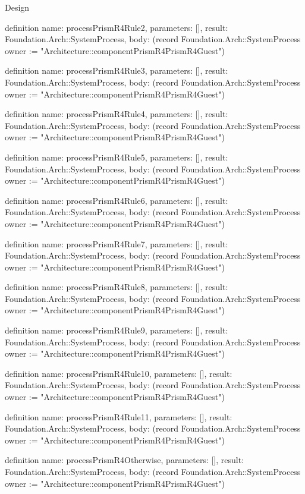 \begin{lexlean}{Design}
\begin{semanticmodule}
definition{
  name: processPrismR4Rule2,
  parameters: [],
  result: Foundation.Arch::SystemProcess,
  body: (record Foundation.Arch::SystemProcess {owner := "Architecture::componentPrismR4PrismR4Guest"})
}

definition{
  name: processPrismR4Rule3,
  parameters: [],
  result: Foundation.Arch::SystemProcess,
  body: (record Foundation.Arch::SystemProcess {owner := "Architecture::componentPrismR4PrismR4Guest"})
}

definition{
  name: processPrismR4Rule4,
  parameters: [],
  result: Foundation.Arch::SystemProcess,
  body: (record Foundation.Arch::SystemProcess {owner := "Architecture::componentPrismR4PrismR4Guest"})
}

definition{
  name: processPrismR4Rule5,
  parameters: [],
  result: Foundation.Arch::SystemProcess,
  body: (record Foundation.Arch::SystemProcess {owner := "Architecture::componentPrismR4PrismR4Guest"})
}

definition{
  name: processPrismR4Rule6,
  parameters: [],
  result: Foundation.Arch::SystemProcess,
  body: (record Foundation.Arch::SystemProcess {owner := "Architecture::componentPrismR4PrismR4Guest"})
}

definition{
  name: processPrismR4Rule7,
  parameters: [],
  result: Foundation.Arch::SystemProcess,
  body: (record Foundation.Arch::SystemProcess {owner := "Architecture::componentPrismR4PrismR4Guest"})
}

definition{
  name: processPrismR4Rule8,
  parameters: [],
  result: Foundation.Arch::SystemProcess,
  body: (record Foundation.Arch::SystemProcess {owner := "Architecture::componentPrismR4PrismR4Guest"})
}

definition{
  name: processPrismR4Rule9,
  parameters: [],
  result: Foundation.Arch::SystemProcess,
  body: (record Foundation.Arch::SystemProcess {owner := "Architecture::componentPrismR4PrismR4Guest"})
}

definition{
  name: processPrismR4Rule10,
  parameters: [],
  result: Foundation.Arch::SystemProcess,
  body: (record Foundation.Arch::SystemProcess {owner := "Architecture::componentPrismR4PrismR4Guest"})
}

definition{
  name: processPrismR4Rule11,
  parameters: [],
  result: Foundation.Arch::SystemProcess,
  body: (record Foundation.Arch::SystemProcess {owner := "Architecture::componentPrismR4PrismR4Guest"})
}

definition{
  name: processPrismR4Otherwise,
  parameters: [],
  result: Foundation.Arch::SystemProcess,
  body: (record Foundation.Arch::SystemProcess {owner := "Architecture::componentPrismR4PrismR4Guest"})
}


\end{semanticmodule}
\end{lexlean}
